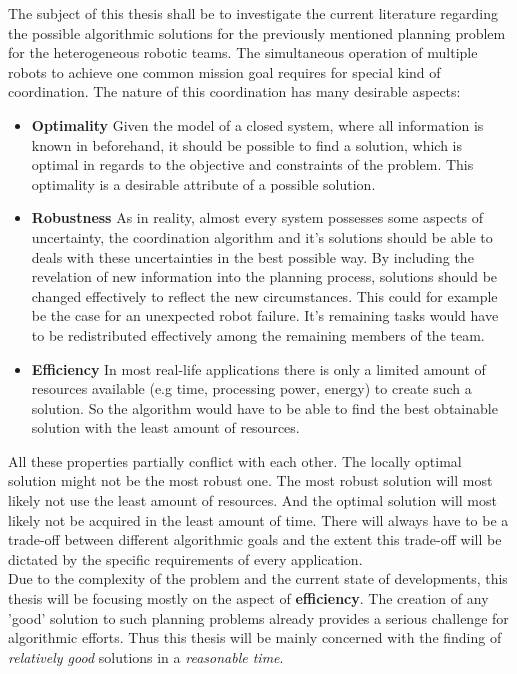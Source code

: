 The subject of this thesis shall be to investigate the current literature regarding the possible algorithmic solutions for the previously mentioned planning problem for the heterogeneous robotic teams. The simultaneous operation of multiple robots to achieve one common mission goal requires for special kind of coordination. The nature of this coordination has many desirable aspects:
\begin{itemize}
\item \textbf{Optimality} Given the model of a closed system, where all information is known in beforehand, it should be possible to find a solution, which is optimal in regards to the objective and constraints of the problem. This optimality is a desirable attribute of a possible solution.
\item \textbf{Robustness} As in reality, almost every system possesses some aspects of uncertainty, the coordination algorithm and it's solutions should be able to deals with these uncertainties in the best possible way. By including the revelation of new information into the planning process, solutions should be changed effectively to reflect the new circumstances. This could for example be the case for an unexpected robot failure. It's remaining tasks would have to be redistributed effectively among the remaining members of the team.
\item \textbf{Efficiency} In most real-life applications there is only a limited amount of resources available (e.g time, processing power, energy) to create such a solution. So the algorithm would have to be able to find the best obtainable solution with the least amount of resources.
\end{itemize}
All these properties partially conflict with each other. The locally optimal solution might not be the most robust one. The most robust solution will most likely not use the least amount of resources. And the optimal solution will most likely not be acquired in the least amount of time. There will always have to be a trade-off between different algorithmic goals and the extent this trade-off will be dictated by the specific requirements of every application.\\
Due to the complexity of the problem and the current state of developments, this thesis will be focusing mostly on the aspect of \textbf{efficiency}. The creation of any 'good' solution to such planning problems already provides a serious challenge for algorithmic efforts. Thus this thesis will be mainly concerned with the finding of \textit{relatively good} solutions in a \textit{reasonable time}.\\ \\

